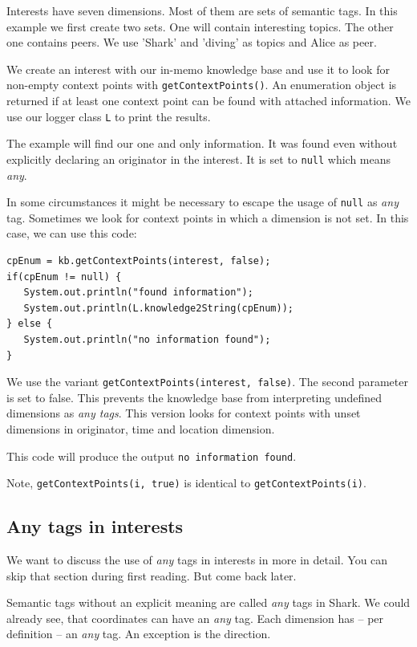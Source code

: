 Interests have seven dimensions. Most of them are sets of semantic tags. In this example we first create two sets. One will contain interesting topics. The other one contains peers. We use 'Shark' and 'diving' as topics and Alice as peer.

We create an interest with our in-memo knowledge base and use it to look for non-empty context points with {\tt getContextPoints()}. An enumeration object is returned if at least one context point can be found with attached information.
We use our logger class {\tt L} to print the results.

The example will find our one and only information. It was found even without explicitly declaring an originator in the interest. It is set to {\tt null} which means {\it any}.

In some circumstances it might be necessary to escape the usage of {\tt null} as {\it any} tag. Sometimes we look for context points in which a dimension is not set. In this case, we can use this code:

\begin{verbatim}
cpEnum = kb.getContextPoints(interest, false);
if(cpEnum != null) {
   System.out.println("found information");
   System.out.println(L.knowledge2String(cpEnum));
} else {
   System.out.println("no information found");
}
\end{verbatim}

We use the variant {\tt getContextPoints(interest, false)}. The second parameter is set to false. This prevents the knowledge base from interpreting undefined dimensions as {\it any tags}. This version looks for context points with unset dimensions in originator, time and location dimension.

This code will produce the output {\tt no information found}.

Note, {\tt getContextPoints(i, true)} is identical to {\tt getContextPoints(i)}.

\subsection{Any tags in interests}
We want to discuss the use of {\it any} tags in interests in more in detail. You can skip that section during first reading. But come back later.

Semantic tags without an explicit meaning are called {\it any} tags in Shark.
We could already see, that coordinates can have an {\it any} tag. Each dimension has -- per definition -- an {\it any} tag. An exception is the direction.

